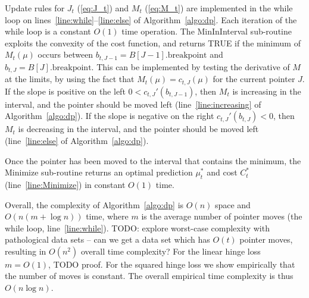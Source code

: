 \documentclass{article}
\begin{document}
Update rules for $J_t$ (\ref{eq:J_t}) and $M_t$ (\ref{eq:M_t}) are
implemented in the while loop on
lines~\ref{line:while}--\ref{line:else} of
Algorithm~\ref{algo:dp}. Each iteration of the while loop is a
constant $O(1)$ time operation. The MinInInterval sub-routine exploits
the convexity of the cost function, and returns TRUE if the minimum of
$M_t(\mu)$ occurs between $b_{t,J-1}=B[J-1].\text{breakpoint}$ and
$b_{t,J}=B[J].\text{breakpoint}$. This can be implemented by testing
the derivative of $M$ at the limits, by using the fact that
$M_t(\mu)=c_{t,J}(\mu)$ for the current pointer $J$. If the slope is
positive on the left $0<c_{t,J}'(b_{t,J-1})$, then $M_t$ is increasing
in the interval, and the pointer should be moved left
(line~\ref{line:increasing} of Algorithm~\ref{algo:dp}). If the slope
is negative on the right $c_{t,J}'(b_{t,J})<0$, then $M_t$ is
decreasing in the interval, and the pointer should be moved left
(line~\ref{line:else} of Algorithm~\ref{algo:dp}).

Once the pointer has been moved to the interval that contains the
minimum, the Minimize sub-routine returns an optimal prediction
$\mu_t^*$ and cost $C_t^*$ (line~\ref{line:Minimize}) in constant
$O(1)$ time.

Overall, the complexity of Algorithm~\ref{algo:dp} is $O(n)$ space and
$O(n (m + \log n))$ time, where $m$ is the average number of pointer moves
(the while loop, line~\ref{line:while}). TODO: explore worst-case
complexity with pathological data sets -- can we get a data set which
has $O(t)$ pointer moves, resulting in $O(n^2)$ overall time
complexity? For the linear hinge loss $m=O(1)$, TODO proof. For the
squared hinge loss we show empirically that the number of moves is
constant. The overall empirical time complexity is thus $O(n\log n)$.
\end{document}
